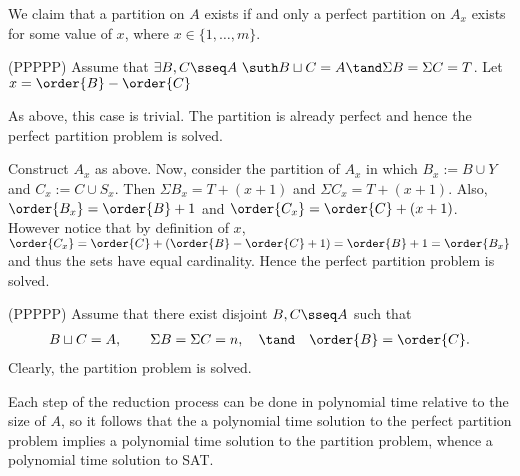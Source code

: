 \documentclass{article}
\begin{document}
\begin{solution}
  We claim that a partition on $A$ exists if and only a perfect partition on $A_x$ exists for some value of $x$, where $ x\in \{1,\ldots,m\}$.

  \begin{subproof}[Correctness.]
    (PP\imp PPP)
    Assume that $ \exists B,C\sseq A\ \suth B\sqcup C = A \tand \Sigma B = \Sigma C = T $. Let $ x=\order{B}-\order{C} $

    \begin{subproof}[Case 1 ($ x = 0 $).]
      As above, this case is trivial. The partition is already perfect and hence the perfect partition problem is solved.
    \end{subproof}
    \begin{subproof}
      Construct $ A_x $ as above.
      Now, consider the partition of $ A_x $ in which $ B_x := B\cup Y $ and $ C_x := C\cup S_x $.
      Then $ \Sigma B_x = T + (x+1) $ and $ \Sigma C_x = T + (x+1) $.
      Also, $ \order{B_x} = \order{B}+1 $ and $ \order{C_x} = \order{C}+(x+1) $.
      However notice that by definition of $ x $, $ \order{C_x} = \order{C} + (\order{B} - \order{C} + 1) = \order{B} + 1 = \order{B_x} $ and thus the sets have equal cardinality.
      Hence the perfect partition problem is solved.
    \end{subproof}

    (PP\pmi PPP)
    Assume that there exist disjoint $ B,C\sseq A $ such that
    \begin{align*}
      B\sqcup C = A, \qquad \Sigma B = \Sigma C = n, \quad \tand \quad \order{B}=\order{C}.
    \end{align*}
    Clearly, the partition problem is solved.
  \end{subproof}
  Each step of the reduction process can be done in polynomial time relative to the size of $ A $, so it follows that the a polynomial time solution to the perfect partition problem implies a polynomial time solution to the partition problem, whence a polynomial time solution to SAT.
\end{solution}
\pagebreak
\end{document}
